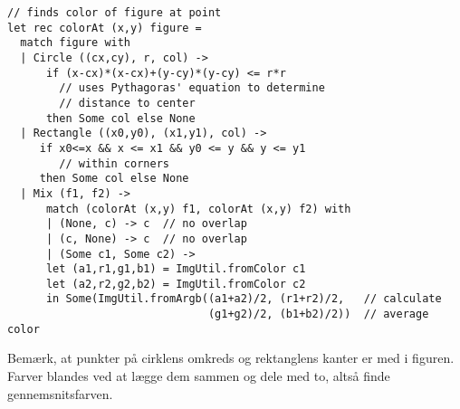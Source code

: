 \begin{lstlisting}[numbers=none,frame=none,mathescape]
// finds color of figure at point
let rec colorAt (x,y) figure =
  match figure with
  | Circle ((cx,cy), r, col) ->
      if (x-cx)*(x-cx)+(y-cy)*(y-cy) <= r*r
        // uses Pythagoras' equation to determine
        // distance to center
      then Some col else None
  | Rectangle ((x0,y0), (x1,y1), col) ->
     if x0<=x && x <= x1 && y0 <= y && y <= y1
        // within corners
     then Some col else None
  | Mix (f1, f2) ->
      match (colorAt (x,y) f1, colorAt (x,y) f2) with
      | (None, c) -> c  // no overlap
      | (c, None) -> c  // no overlap
      | (Some c1, Some c2) ->
      let (a1,r1,g1,b1) = ImgUtil.fromColor c1
      let (a2,r2,g2,b2) = ImgUtil.fromColor c2
      in Some(ImgUtil.fromArgb((a1+a2)/2, (r1+r2)/2,   // calculate
                               (g1+g2)/2, (b1+b2)/2))  // average color
\end{lstlisting}

\noindent
Bemærk, at punkter på cirklens omkreds og rektanglens kanter er med i
figuren.  Farver blandes ved at lægge dem sammen og dele med to, altså
finde gennemsnitsfarven.
